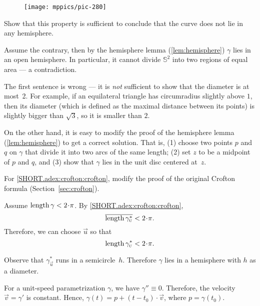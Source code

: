 \begin{multicols}{2}
\begin{wrapfigure}[6]{r}{23 mm}
\vskip-6mm
\centering
\texttt{[image: mppics/pic-280]}
\vskip0mm
\end{wrapfigure}

Show that this property is sufficient to conclude that the curve does not lie in any hemisphere.

Assume the contrary, then by the hemisphere lemma (\ref{lem:hemisphere}) $\gamma$ lies in an open hemisphere.
In particular, it cannot divide $\mathbb{S}^2$ into two regions of equal area --- a contradiction.

The first sentence is wrong --- it is \textit{not} sufficient to show that the diameter is at most~2.
For example, if an equilateral triangle has circumradius slightly above $1$,
then its diameter (which is defined as the maximal distance between its points) is slightly bigger than $\sqrt3$, so it is smaller than $2$.

On the other hand, it is easy to modify the proof of the hemisphere lemma (\ref{lem:hemisphere}) to get a correct solution.
That is, (1) choose two points $p$ and $q$ on $\gamma$ that divide it into two arcs of the same length;
(2) set $z$ to be a midpoint of $p$ and $q$,
and (3) show that $\gamma$ lies in the unit disc centered at~$z$.


For \ref{SHORT.adex:crofton:crofton}, modify the proof of the original Crofton formula
(Section~\ref{sec:crofton}).

Assume $\length \gamma<2\cdot\pi$.
By \ref{SHORT.adex:crofton:crofton},
\[\overline{\length \gamma^*_{\vec u}}<2\cdot\pi.\]
Therefore, we can choose ${\vec u}$ so that 
\[\length \gamma^*_{\vec u}<2\cdot\pi.\]

Observe that $\gamma^*_{\vec u}$ runs in a semicircle~$h$.
Therefore $\gamma$ lies in a hemisphere with $h$ as a diameter.


\setcounter{eqtn}{0}


For a unit-speed parametrization $\gamma$, we have $\gamma''\equiv 0$.
Therefore, the velocity $\vec v=\gamma'$ is constant.
Hence, $\gamma(t)=p+(t-t_0)\cdot \vec v$, where $p=\gamma(t_0)$.



\end{multicols}
